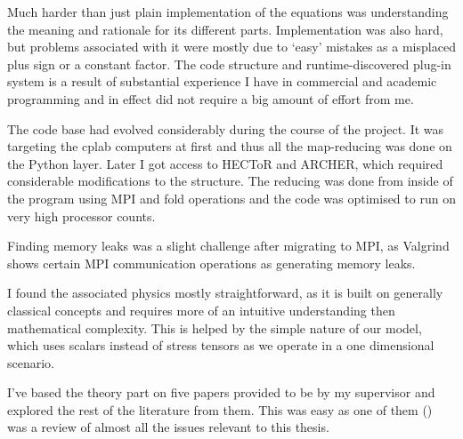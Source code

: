 \documentclass[11pt,a4paper]{article}
\begin{document}
\begin{appendices}
    Much harder than just plain implementation of the equations was understanding the meaning and rationale for its different parts.
    Implementation was also hard, but problems associated with it were mostly due to `easy' mistakes as a misplaced plus sign or a constant factor.
    The code structure and runtime-discovered plug-in system is a result of substantial experience I have in commercial and academic programming and in effect did not require a big amount of effort from me.

    The code base had evolved considerably during the course of the project.
    It was targeting the cplab computers at first and thus all the map-reducing was done on the Python layer.
    Later I got access to HECToR and ARCHER, which required considerable modifications to the structure.
    The reducing was done from inside of the program using MPI and fold operations and the code was optimised to run on very high processor counts.

    Finding memory leaks was a slight challenge after migrating to MPI, as Valgrind shows certain MPI communication operations as generating memory leaks.

    I found the associated physics mostly straightforward, as it is built on generally classical concepts and requires more of an intuitive understanding then mathematical complexity.
    This is helped by the simple nature of our model, which uses scalars instead of stress tensors as we operate in a one dimensional scenario.

    I've based the theory part on five papers provided to be by my supervisor and explored the rest of the literature from them.
    This was easy as one of them (\cite{Eckhardt07}) was a review of almost all the issues relevant to this thesis.



\end{appendices}
\end{document}
